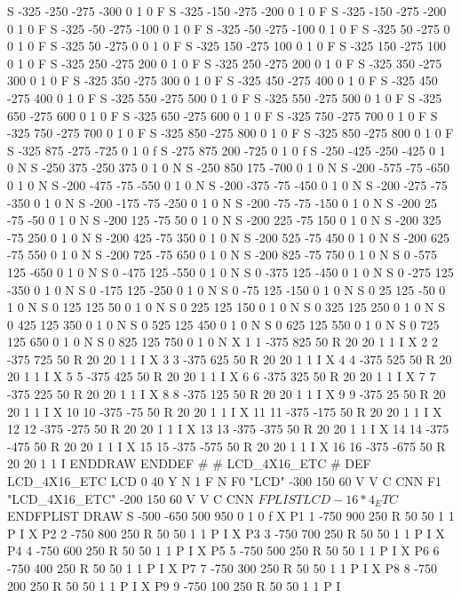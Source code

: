 S -325 -250 -275 -300 0 1 0 F
S -325 -150 -275 -200 0 1 0 F
S -325 -150 -275 -200 0 1 0 F
S -325 -50 -275 -100 0 1 0 F
S -325 -50 -275 -100 0 1 0 F
S -325 50 -275 0 0 1 0 F
S -325 50 -275 0 0 1 0 F
S -325 150 -275 100 0 1 0 F
S -325 150 -275 100 0 1 0 F
S -325 250 -275 200 0 1 0 F
S -325 250 -275 200 0 1 0 F
S -325 350 -275 300 0 1 0 F
S -325 350 -275 300 0 1 0 F
S -325 450 -275 400 0 1 0 F
S -325 450 -275 400 0 1 0 F
S -325 550 -275 500 0 1 0 F
S -325 550 -275 500 0 1 0 F
S -325 650 -275 600 0 1 0 F
S -325 650 -275 600 0 1 0 F
S -325 750 -275 700 0 1 0 F
S -325 750 -275 700 0 1 0 F
S -325 850 -275 800 0 1 0 F
S -325 850 -275 800 0 1 0 F
S -325 875 -275 -725 0 1 0 f
S -275 875 200 -725 0 1 0 f
S -250 -425 -250 -425 0 1 0 N
S -250 375 -250 375 0 1 0 N
S -250 850 175 -700 0 1 0 N
S -200 -575 -75 -650 0 1 0 N
S -200 -475 -75 -550 0 1 0 N
S -200 -375 -75 -450 0 1 0 N
S -200 -275 -75 -350 0 1 0 N
S -200 -175 -75 -250 0 1 0 N
S -200 -75 -75 -150 0 1 0 N
S -200 25 -75 -50 0 1 0 N
S -200 125 -75 50 0 1 0 N
S -200 225 -75 150 0 1 0 N
S -200 325 -75 250 0 1 0 N
S -200 425 -75 350 0 1 0 N
S -200 525 -75 450 0 1 0 N
S -200 625 -75 550 0 1 0 N
S -200 725 -75 650 0 1 0 N
S -200 825 -75 750 0 1 0 N
S 0 -575 125 -650 0 1 0 N
S 0 -475 125 -550 0 1 0 N
S 0 -375 125 -450 0 1 0 N
S 0 -275 125 -350 0 1 0 N
S 0 -175 125 -250 0 1 0 N
S 0 -75 125 -150 0 1 0 N
S 0 25 125 -50 0 1 0 N
S 0 125 125 50 0 1 0 N
S 0 225 125 150 0 1 0 N
S 0 325 125 250 0 1 0 N
S 0 425 125 350 0 1 0 N
S 0 525 125 450 0 1 0 N
S 0 625 125 550 0 1 0 N
S 0 725 125 650 0 1 0 N
S 0 825 125 750 0 1 0 N
X 1 1 -375 825 50 R 20 20 1 1 I
X 2 2 -375 725 50 R 20 20 1 1 I
X 3 3 -375 625 50 R 20 20 1 1 I
X 4 4 -375 525 50 R 20 20 1 1 I
X 5 5 -375 425 50 R 20 20 1 1 I
X 6 6 -375 325 50 R 20 20 1 1 I
X 7 7 -375 225 50 R 20 20 1 1 I
X 8 8 -375 125 50 R 20 20 1 1 I
X 9 9 -375 25 50 R 20 20 1 1 I
X 10 10 -375 -75 50 R 20 20 1 1 I
X 11 11 -375 -175 50 R 20 20 1 1 I
X 12 12 -375 -275 50 R 20 20 1 1 I
X 13 13 -375 -375 50 R 20 20 1 1 I
X 14 14 -375 -475 50 R 20 20 1 1 I
X 15 15 -375 -575 50 R 20 20 1 1 I
X 16 16 -375 -675 50 R 20 20 1 1 I
ENDDRAW
ENDDEF
#
# LCD_4X16_ETC
#
DEF LCD_4X16_ETC LCD 0 40 Y N 1 F N
F0 "LCD" -300 150 60 V V C CNN
F1 "LCD_4X16_ETC" -200 150 60 V V C CNN
$FPLIST
 LCD-16*4_ETC
$ENDFPLIST
DRAW
S -500 -650 500 950 0 1 0 f
X P1 1 -750 900 250 R 50 50 1 1 P I
X P2 2 -750 800 250 R 50 50 1 1 P I
X P3 3 -750 700 250 R 50 50 1 1 P I
X P4 4 -750 600 250 R 50 50 1 1 P I
X P5 5 -750 500 250 R 50 50 1 1 P I
X P6 6 -750 400 250 R 50 50 1 1 P I
X P7 7 -750 300 250 R 50 50 1 1 P I
X P8 8 -750 200 250 R 50 50 1 1 P I
X P9 9 -750 100 250 R 50 50 1 1 P I
